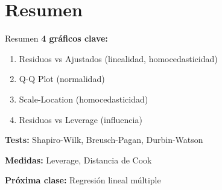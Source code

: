 \documentclass[aspectratio=169]{beamer}
\begin{document}
\section{Resumen}

\begin{frame}{Resumen}
\textbf{4 gráficos clave:}
\begin{enumerate}
    \item Residuos vs Ajustados (linealidad, homocedasticidad)
    \item Q-Q Plot (normalidad)
    \item Scale-Location (homocedasticidad)
    \item Residuos vs Leverage (influencia)
\end{enumerate}

\vspace{0.3cm}
\textbf{Tests:} Shapiro-Wilk, Breusch-Pagan, Durbin-Watson

\vspace{0.3cm}
\textbf{Medidas:} Leverage, Distancia de Cook

\vspace{0.5cm}
\textbf{Próxima clase:} Regresión lineal múltiple
\end{frame}
\end{document}
